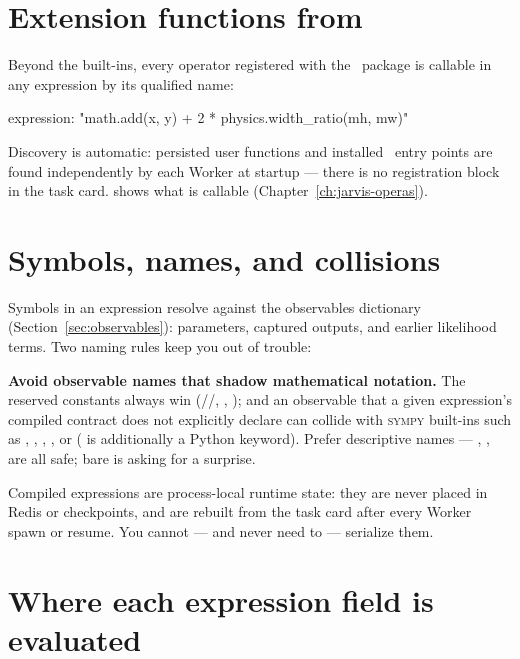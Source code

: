 \section{Extension functions from \Operas}
\label{sec:expr-operas-functions}

Beyond the built-ins, every operator registered with the \Operas\ package is callable in
any expression by its qualified name:

\begin{yamlwin}
expression: "math.add(x, y) + 2 * physics.width_ratio(mh, mw)"
\end{yamlwin}

Discovery is automatic: persisted user functions and installed \Operas\ entry points are
found independently by each Worker at startup --- there is no registration block in the
task card.  shows what is callable
(Chapter~\ref{ch:jarvis-operas}).

\section{Symbols, names, and collisions}
\label{sec:expr-collisions}

Symbols in an expression resolve against the observables dictionary
(Section~\ref{sec:observables}): parameters, captured outputs, and earlier likelihood
terms. Two naming rules keep you out of trouble:

\begin{jwarn}
\textbf{Avoid observable names that shadow mathematical notation.} The reserved constants
always win (//, , ); and an observable that a given expression's
compiled contract does not explicitly declare can collide with \textsc{sympy} built-ins
such as , , , , or 
( is additionally a Python keyword). Prefer descriptive names ---
, ,  are all safe; bare  is asking
for a surprise.
\end{jwarn}

\begin{jnote}
Compiled expressions are process-local runtime state: they are never placed in Redis or
checkpoints, and are rebuilt from the task card after every Worker spawn or resume. You
cannot --- and never need to --- serialize them.
\end{jnote}

\section{Where each expression field is evaluated}
\label{sec:expr-where}

